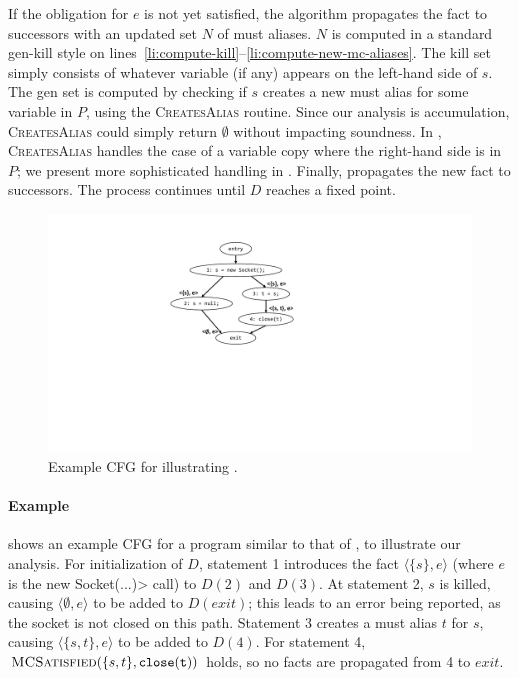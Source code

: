 If the obligation for $e$ is not yet satisfied, the algorithm propagates the
fact to successors with an updated set $N$ of must aliases.  $N$ is computed in
a standard gen-kill style on
lines~\ref{li:compute-kill}--\ref{li:compute-new-mc-aliases}.  The kill set
simply consists of whatever variable (if any) appears on the left-hand side of
$s$.  The gen set is computed by checking if $s$ creates a new must alias for
some variable in $P$, using the \textsc{CreatesAlias} routine.  Since our
analysis is accumulation, \textsc{CreatesAlias} could simply return $\emptyset$
without impacting soundness.  In , \textsc{CreatesAlias}
handles the case of a variable copy where the right-hand side is in $P$; we
present more sophisticated handling in . Finally,
 propagates the new fact to successors.  The process
continues until $D$ reaches a fixed point.

\begin{figure}
  \includegraphics[width=0.95\columnwidth,keepaspectratio]{cfg-example.pdf}
  \caption{Example CFG for illustrating .}
  \label{fig:cfg-example}
\end{figure}

\paragraph{Example}  shows an example CFG for a program
similar to that of , to illustrate our analysis.  For
initialization of $D$, statement 1 introduces the fact $\langle \{ s \}, e
\rangle$ (where $e$ is the \<new Socket(...)> call) to $D(2)$ and $D(3)$.  At
statement 2, $s$ is killed, causing $\langle \emptyset , e \rangle$ to be added
to $D(\mathit{exit})$; this leads to an error being reported, as the socket is
not closed on this path.  Statement 3 creates a must alias $t$ for $s$, causing
$\langle \{ s, t \}, e \rangle$ to be added to $D(4)$.  For statement 4,
$\textsc{MCSatisfied}(\{s,t\},\mathtt{close(t)})$ holds, so no facts are
propagated from 4 to $\mathit{exit}$.

